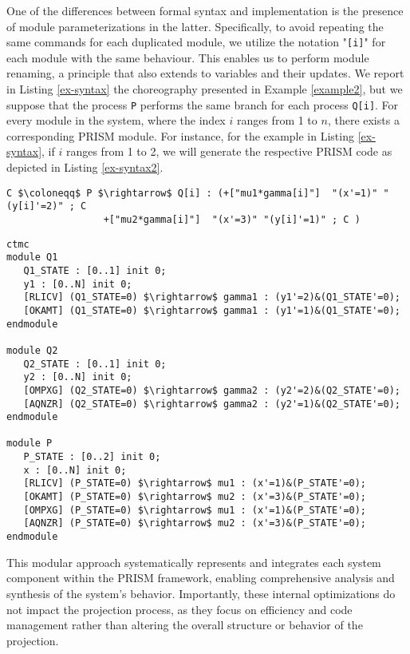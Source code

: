 One of the differences between formal syntax and implementation is the
presence of module parameterizations in the latter. Specifically, to
avoid repeating the same commands for each duplicated module, we
utilize the notation "\texttt{[i]}" for each module with the same
behaviour.  This enables us to perform module renaming, a principle
that also extends to variables and their updates. We report in Listing \ref{ex-syntax} the choreography presented in Example \ref{example2}, but we suppose that the process \texttt{P} performs the same
branch for each process
\texttt{Q[i]}. %
For every module in the system, where the index $i$ ranges from 1 to
$n$, there exists a corresponding PRISM module. For instance, for the
example in Listing \ref{ex-syntax}, if $i$ ranges from 1 to 2, we will
generate the respective PRISM code as depicted in Listing
\ref{ex-syntax2}.
\begin{lstlisting}[style=chor-color,breaklines=true, postbreak=\mbox{\textcolor{red}{$\hookrightarrow$}\space},caption={Example of an use of parameterization in the choreographic language},captionpos=b,label={ex-syntax}]
	C $\coloneqq$ P $\rightarrow$ Q[i] : (+["mu1*gamma[i]"]  "(x'=1)" "(y[i]'=2)" ; C
			     +["mu2*gamma[i]"]  "(x'=3)" "(y[i]'=1)" ; C )
\end{lstlisting}
\begin{lstlisting}[style=prism-color,caption={PRISM code generated for the choreography in Listing \ref{ex-syntax}},captionpos=b,label={ex-syntax2}]
ctmc
module Q1
   Q1_STATE : [0..1] init 0;
   y1 : [0..N] init 0;
   [RLICV] (Q1_STATE=0) $\rightarrow$ gamma1 : (y1'=2)&(Q1_STATE'=0);
   [OKAMT] (Q1_STATE=0) $\rightarrow$ gamma1 : (y1'=1)&(Q1_STATE'=0);
endmodule

module Q2
   Q2_STATE : [0..1] init 0;
   y2 : [0..N] init 0;
   [OMPXG] (Q2_STATE=0) $\rightarrow$ gamma2 : (y2'=2)&(Q2_STATE'=0);
   [AQNZR] (Q2_STATE=0) $\rightarrow$ gamma2 : (y2'=1)&(Q2_STATE'=0);
endmodule

module P
   P_STATE : [0..2] init 0;
   x : [0..N] init 0;
   [RLICV] (P_STATE=0) $\rightarrow$ mu1 : (x'=1)&(P_STATE'=0);
   [OKAMT] (P_STATE=0) $\rightarrow$ mu2 : (x'=3)&(P_STATE'=0);
   [OMPXG] (P_STATE=0) $\rightarrow$ mu1 : (x'=1)&(P_STATE'=0);
   [AQNZR] (P_STATE=0) $\rightarrow$ mu2 : (x'=3)&(P_STATE'=0);
endmodule
\end{lstlisting}
This modular approach systematically represents and integrates each system component within the PRISM framework, enabling comprehensive analysis and synthesis of the system's behavior. Importantly, these internal optimizations do not impact the projection process, as they focus on efficiency and code management rather than altering the overall structure or behavior of the projection. %

